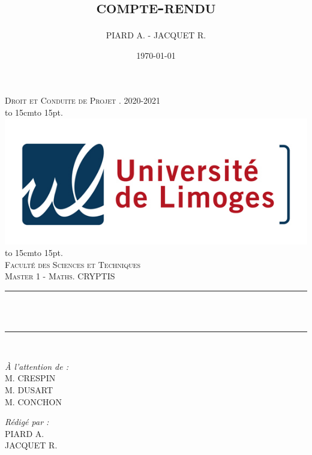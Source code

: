 \documentclass[12pt]{article}
\title{\textsc{compte-rendu}}
\author{PIARD A. - JACQUET R.}
\date{\today}
\makeatletter
\let\thetitle\@title
\def\dotfill#1{\cleaders\hbox to #1{.}\hfill}
\newcommand\dotline[2][.5em]{\leavevmode\hbox to #2{\dotfill{#1}\hfil}}
\makeatother
\begin{document}
\begin{titlepage}
	\centering
    \vspace*{0.5 cm}
    \textsc{\LARGE Droit et Conduite de Projet . 2020-2021}\\[1.0 cm]
    \dotline[15pt]{15cm}\\
	\includegraphics[scale = 2.2]{logo.png}
	\dotline[15pt]{15cm}\\
	\vspace{1.5cm}
	\textsc{\Large Faculté des Sciences et Techniques}\\
	\textsc{\large Master 1 - Maths. CRYPTIS}\\[1.0 cm]
	\rule{\linewidth}{0.2 mm} \\[0.4 cm]
	{ \huge \bfseries \color{blue} \thetitle}\\
	\rule{\linewidth}{0.2 mm} \\[1.5 cm]
	
	\begin{minipage}{0.4\textwidth}
		\begin{flushleft} \large
			\emph{À l'attention de :}\\
			M. CRESPIN\\
			M. DUSART\\
			M. CONCHON\\
		\end{flushleft}
	\end{minipage}
	\begin{minipage}{0.5\textwidth}
    	\begin{flushright} \large
		\emph{Rédigé par :}\\
		PIARD A.\\
		JACQUET R.\\
		\phantom{a}\\
		\end{flushright}
	\end{minipage}\\[2 cm]
\end{titlepage}
\end{document}
